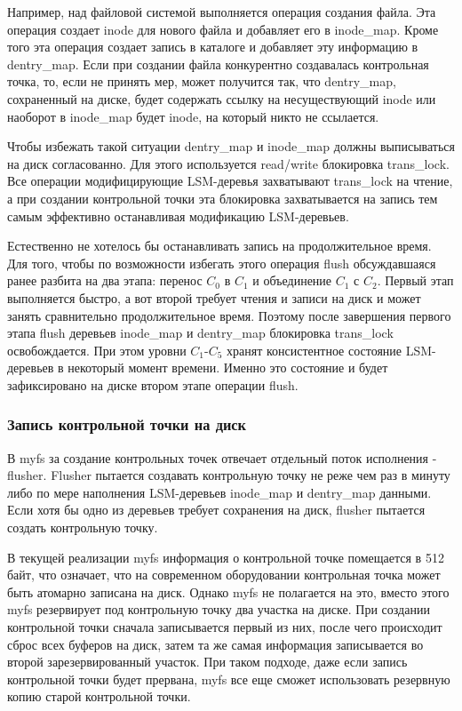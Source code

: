 Например, над файловой системой выполняется операция создания файла. Эта
операция создает inode для нового файла и добавляет его в inode\_map. Кроме того
эта операция создает запись в каталоге и добавляет эту информацию в dentry\_map.
Если при создании файла конкурентно создавалась контрольная точка, то, если не
принять мер, может получится так, что dentry\_map, сохраненный на диске, будет
содержать ссылку на несуществующий inode или наоборот в inode\_map будет inode,
на который никто не ссылается.

Чтобы избежать такой ситуации dentry\_map и inode\_map должны выписываться на
диск согласованно. Для этого используется read/write блокировка trans\_lock. Все
операции модифицирующие LSM-деревья захватывают trans\_lock на чтение, а при
создании контрольной точки эта блокировка захватывается на запись тем самым
эффективно останавливая модификацию LSM-деревьев.

Естественно не хотелось бы останавливать запись на продолжительное время. Для
того, чтобы по возможности избегать этого операция flush обсуждавшаяся ранее
разбита на два этапа: перенос $C_0$ в $C_1$ и объединение $C_1$ с $C_2$. Первый
этап выполняется быстро, а вот второй требует чтения и записи на диск и может
занять сравнительно продолжительное время. Поэтому после завершения первого
этапа flush деревьев inode\_map и dentry\_map блокировка trans\_lock
освобождается. При этом уровни $C_1$-$C_5$ хранят консистентное состояние
LSM-деревьев в некоторый момент времени. Именно это состояние и будет
зафиксировано на диске втором этапе операции flush.


\subsubsection{Запись контрольной точки на диск}

В myfs за создание контрольных точек отвечает отдельный поток исполнения -
flusher. Flusher пытается создавать контрольную точку не реже чем раз в минуту
либо по мере наполнения LSM-деревьев inode\_map и dentry\_map данными. Если хотя
бы одно из деревьев требует сохранения на диск, flusher пытается создать
контрольную точку.

В текущей реализации myfs информация о контрольной точке помещается в 512 байт,
что означает, что на современном оборудовании контрольная точка может быть
атомарно записана на диск. Однако myfs не полагается на это, вместо этого myfs
резервирует под контрольную точку два участка на диске. При создании контрольной
точки сначала записывается первый из них, после чего происходит сброс всех
буферов на диск, затем та же самая информация записывается во второй
зарезервированный участок. При таком подходе, даже если запись контрольной
точки будет прервана, myfs все еще сможет использовать резервную копию старой
контрольной точки.
